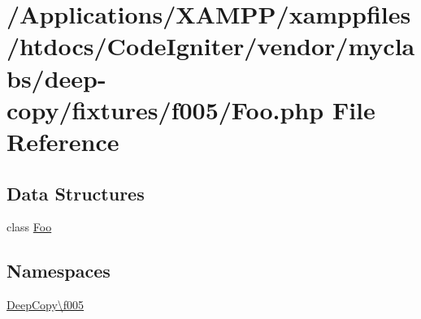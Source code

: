\hypertarget{myclabs_2deep-copy_2fixtures_2f005_2_foo_8php}{}\section{/\+Applications/\+X\+A\+M\+P\+P/xamppfiles/htdocs/\+Code\+Igniter/vendor/myclabs/deep-\/copy/fixtures/f005/\+Foo.php File Reference}
\label{myclabs_2deep-copy_2fixtures_2f005_2_foo_8php}
\subsection*{Data Structures}
\begin{DoxyCompactItemize}
\item 
class \mbox{\hyperlink{class_deep_copy_1_1f005_1_1_foo}{Foo}}
\end{DoxyCompactItemize}
\subsection*{Namespaces}
\begin{DoxyCompactItemize}
\item 
 \mbox{\hyperlink{namespace_deep_copy_1_1f005}{Deep\+Copy\textbackslash{}f005}}
\end{DoxyCompactItemize}
